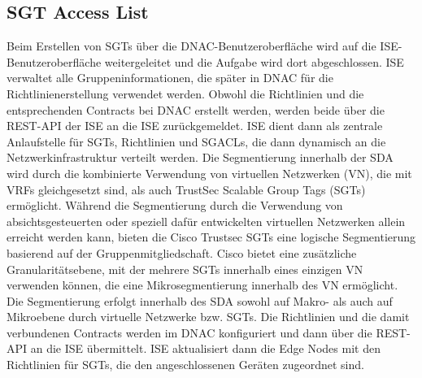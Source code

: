 \subsection{SGT Access List}
Beim Erstellen von SGTs über die DNAC-Benutzeroberfläche wird auf die ISE-Benutzeroberfläche weitergeleitet und die Aufgabe wird dort abgeschlossen. ISE verwaltet alle Gruppeninformationen, die später in DNAC für die Richtlinienerstellung verwendet werden. Obwohl die Richtlinien und die entsprechenden Contracts bei DNAC erstellt werden, werden beide über die REST-API der ISE an die ISE zurückgemeldet. ISE dient dann als zentrale Anlaufstelle für SGTs, Richtlinien und SGACLs, die dann dynamisch an die Netzwerkinfrastruktur verteilt werden.
Die Segmentierung innerhalb der SDA wird durch die kombinierte Verwendung von virtuellen Netzwerken (VN), die mit VRFs gleichgesetzt sind, als auch TrustSec Scalable Group Tags (SGTs) ermöglicht. Während die Segmentierung durch die Verwendung von absichtsgesteuerten oder speziell dafür entwickelten virtuellen Netzwerken allein erreicht werden kann, bieten die Cisco Trustsec SGTs eine logische Segmentierung basierend auf der Gruppenmitgliedschaft. Cisco bietet eine zusätzliche Granularitätsebene, mit der mehrere SGTs innerhalb eines einzigen VN verwenden können, die eine Mikrosegmentierung innerhalb des VN ermöglicht. Die Segmentierung erfolgt innerhalb des SDA sowohl auf Makro- als auch auf Mikroebene durch virtuelle Netzwerke bzw. SGTs. Die Richtlinien und die damit verbundenen Contracts werden im DNAC konfiguriert und dann über die REST-API an die ISE übermittelt. ISE aktualisiert dann die Edge Nodes mit den Richtlinien für SGTs, die den angeschlossenen Geräten zugeordnet sind. 
\cite{sda-segmentation-may2018}

